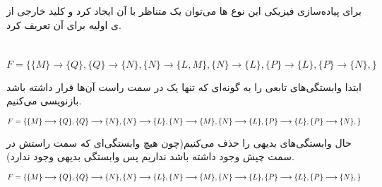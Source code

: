 \documentclass{article}
\begin{document}
\subsection{}
برای پیاده‌سازی فیزیکی این نوع ها می‌توان یک  متناظر با آن  ایجاد کرد و کلید خارجی از ی اولیه برای آن تعریف کرد.

\section{}%
\begin{latin}
$
F=
\{
	\{M\}\longrightarrow\{Q\},
	\{Q\}\longrightarrow\{N\},
	\{N\}\longrightarrow\{L, M\},
	\{N\}\longrightarrow\{L\},
	\{P\}\longrightarrow\{L\},
	\{P\}\longrightarrow\{N\},
\}
$
\end{latin}
ابتدا وابستگی‌های تابعی را به گونه‌ای که تنها یک  در سمت راست آن‌ها قرار داشته باشد بازنویسی می‌کنیم.
\begin{latin}
$
\\F=\\
\{\\
	\{M\}\longrightarrow\{Q\},\\
	\{Q\}\longrightarrow\{N\},\\
	\{N\}\longrightarrow\{L\},\\
	\{N\}\longrightarrow\{M\},\\
	\{N\}\longrightarrow\{L\},\\
	\{P\}\longrightarrow\{L\},\\
	\{P\}\longrightarrow\{N\},\\
\}
$
\end{latin}
حال وابستگی‌های بدیهی را حذف می‌کنیم(چون هیچ وابستگی‌ای که سمت راستش در سمت چپش وجود داشته باشد نداریم پس وابستگی بدیهی وجود ندارد).
\begin{latin}
$
\\F=\\
\{\\
	\{M\}\longrightarrow\{Q\},\\
	\{Q\}\longrightarrow\{N\},\\
	\{N\}\longrightarrow\{L\},\\
	\{N\}\longrightarrow\{M\},\\
	\{N\}\longrightarrow\{L\},\\
	\{P\}\longrightarrow\{L\},\\
	\{P\}\longrightarrow\{N\},\\
\}
$
\end{latin}
\end{document}
